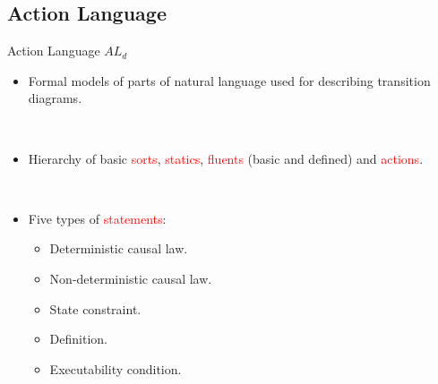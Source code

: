 \documentclass[xcolor=dvipsnames]{beamer}
\begin{document}
\subsection{Action Language}

\begin{frame}[fragile]{Action Language $AL_d$}
  \begin{itemize}
  \item Formal models of parts of natural language used for describing
    transition diagrams.

    \ \\
  \item Hierarchy of basic \textcolor{red}{sorts},
    \textcolor{red}{statics}, \textcolor{red}{fluents} (basic and
    defined) and \textcolor{red}{actions}.
    
    \ \\
  \item Five types of \textcolor{red}{statements}: 
    \begin{itemize}
    \item Deterministic causal law.
    \item Non-deterministic causal law.
    \item State constraint.
    \item Definition.
    \item Executability condition.
    \end{itemize}
  \end{itemize}
\end{frame}





\end{document}

